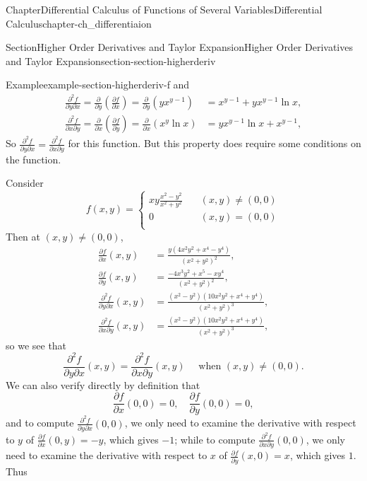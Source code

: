 \documentclass[oneside,10pt,]{book}
\numberwithin{equation}{section}
\newcommand{\amp}{&}
\begin{document}
\begin{chapterptx}{Chapter}{Differential Calculus of Functions of Several Variables}{}{Differential Calculus}{}{}{chapter-ch_differentiaion}
\begin{sectionptx}{Section}{Higher Order Derivatives and Taylor Expansion}{}{Higher Order Derivatives and Taylor Expansion}{}{}{section-section-higherderiv}
\begin{example}{Example}{}{example-section-higherderiv-f}
and%
\begin{align*}
\frac{\partial^2 f}{\partial y \partial x} =  \frac{\partial }{\partial y}\left( \frac{\partial f}{\partial x}
\right) =  \frac{\partial }{\partial y}\left( y x^{y-1} \right) \amp= x^{y-1}+ y x^{y-1} \ln x,\\
\frac{\partial^2 f}{\partial x \partial y} =  \frac{\partial }{\partial x}\left( \frac{\partial f}{\partial y}
\right) =   \frac{\partial }{\partial x}\left(x^{y} \ln x \right) \amp= y x^{y-1} \ln x + x^{y-1},
\end{align*}
So \(\frac{\partial^2 f}{\partial y \partial x}= \frac{\partial^2 f}{\partial x \partial y}\) for this function. But this property does require some conditions on the function.%
\par
Consider%
\begin{equation*}
f(x, y)=\begin{cases} xy \frac{x^{2}-y^{2}}{x^{2}+y^{2}}\quad \amp (x, y)\ne (0, 0)\\
0 \quad \amp (x, y)= (0, 0)\\
\end{cases}
\end{equation*}
Then at \((x, y)\ne (0, 0)\),%
\begin{align*}
\frac{\partial f}{\partial x}(x, y) \amp= \frac{y \left(4 x^2 y^2+x^4-y^4\right)}{\left(x^2+y^2\right)^2},\\
\frac{\partial f}{\partial y}(x, y) \amp=\frac{-4 x^3 y^2+x^5-x y^4}{\left(x^2+y^2\right)^2},\\
\frac{\partial^{2} f}{\partial y \partial x}(x, y) \amp=\frac{\left(x^2-y^2\right) \left(10 x^2 y^2+x^4+y^4\right)}{\left(x^2+y^2\right)^3},\\
\frac{\partial^{2} f}{\partial x \partial y}(x, y) \amp=\frac{\left(x^2-y^2\right) \left(10 x^2 y^2+x^4+y^4\right)}{\left(x^2+y^2\right)^3},
\end{align*}
so we see that%
\begin{equation*}
\frac{\partial^{2} f}{\partial y \partial x}(x, y)= \frac{\partial^{2} f}{\partial x \partial y}(x, y)  \quad \text{ when }
(x, y)\ne (0, 0).
\end{equation*}
We can also verify directly by definition that%
\begin{equation*}
\frac{\partial f}{\partial x}(0, 0)=0, \quad \frac{\partial f}{\partial y}(0, 0)=0,
\end{equation*}
and to compute \(\frac{\partial^{2} f}{\partial y \partial x}(0, 0)\), we only need to examine the derivative with respect to \(y\) of \(\frac{\partial f}{\partial x}(0, y)= -y\), which gives \(-1\); while to compute \(\frac{\partial^{2} f}{\partial x \partial y}(0, 0)\), we only need to examine the derivative with respect to \(x\) of \(\frac{\partial f}{\partial y}(x, 0)=x\), which gives \(1\). Thus%

\end{example}
\end{sectionptx}
\end{chapterptx}
\end{document}
